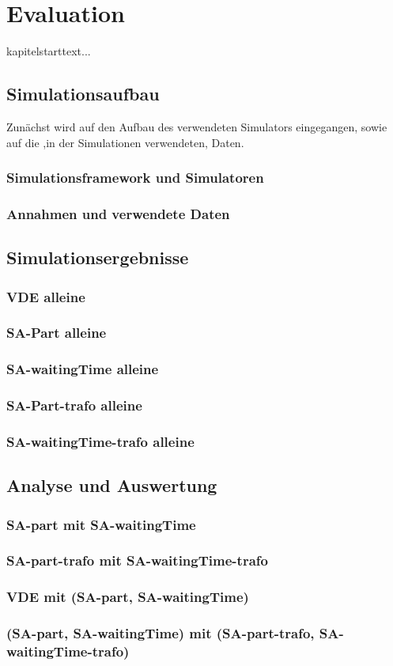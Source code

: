 \chapter{Evaluation}
kapitelstarttext...
\section{Simulationsaufbau}
Zunächst wird auf den Aufbau des verwendeten Simulators eingegangen, sowie auf die ,in der Simulationen verwendeten, Daten.
\subsection{Simulationsframework und Simulatoren}


\subsection{Annahmen und verwendete Daten}
\section{Simulationsergebnisse}
\subsection{VDE alleine}
\subsection{SA-Part alleine}
\subsection{SA-waitingTime alleine}
\subsection{SA-Part-trafo alleine}
\subsection{SA-waitingTime-trafo alleine}
\section{Analyse und Auswertung}
\subsection{SA-part mit SA-waitingTime}
\subsection{SA-part-trafo mit SA-waitingTime-trafo}
\subsection{VDE mit (SA-part, SA-waitingTime)}
\subsection{(SA-part, SA-waitingTime) mit (SA-part-trafo, SA-waitingTime-trafo)}
